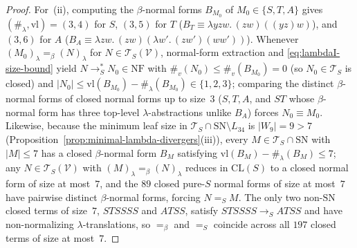 \documentclass[11pt,reqno]{amsart}
\numberwithin{equation}{section}
\theoremstyle{plain}
\theoremstyle{definition}
\theoremstyle{remark}
\newcommand{\CLS}{\mathrm{CL}(S)}
\newcommand{\TS}{\mathcal{T}_S}
\newcommand{\TSV}{\mathcal{T}_S(\mathcal{V})}
\newcommand{\NF}{\mathrm{NF}}
\newcommand{\SN}{\mathrm{SN}}
\newcommand{\redS}{\to_S}
\newcommand{\redSs}{\to_S^*}
\newcommand{\convS}{=_S}
\begin{document}
\begin{proof}
For~(ii), computing the $\beta$-normal forms $B_{M_0}$ of $M_0 \in \{S, T, A\}$ gives $(\#_\lambda, \mathrm{vl}) = (3, 4)$ for $S$, $(3, 5)$ for $T$ ($B_T \equiv \lambda y z w.\, (z w)((y z) w)$), and $(3, 6)$ for $A$ ($B_A \equiv \lambda z w.\, (z w)(\lambda w'.\, (z w')(w w'))$). Whenever $(M_0)_\lambda =_\beta (N)_\lambda$ for $N \in \TSV$, normal-form extraction and \eqref{eq:lambdaI-size-bound} yield $N \redSs N_0 \in \NF$ with $\#_v(N_0) \le \#_v(B_{M_0}) = 0$ (so $N_0 \in \TS$ is closed) and $|N_0| \le \mathrm{vl}(B_{M_0}) - \#_\lambda(B_{M_0}) \in \{1, 2, 3\}$; comparing the distinct $\beta$-normal forms of closed normal forms up to size~$3$ ($S, T, A$, and $S T$ whose $\beta$-normal form has three top-level $\lambda$-abstractions unlike $B_A$) forces $N_0 \equiv M_0$. Likewise, because the minimum leaf size in $\TS \cap \SN \setminus L_{34}$ is $|W_9| = 9 > 7$ (Proposition~\ref{prop:minimal-lambda-divergers}(iii)), every $M \in \TS \cap \SN$ with $|M| \le 7$ has a closed $\beta$-normal form $B_M$ satisfying $\mathrm{vl}(B_M) - \#_\lambda(B_M) \le 7$; any $N \in \TSV$ with $(M)_\lambda =_\beta (N)_\lambda$ reduces in $\CLS$ to a closed normal form of size at most~$7$, and the $89$ closed pure-$S$ normal forms of size at most~$7$ have pairwise distinct $\beta$-normal forms, forcing $N \convS M$. The only two non-$\SN$ closed terms of size~$7$, $S T S S S S$ and $A T S S$, satisfy $S T S S S S \redS A T S S$ and have non-normalizing $\lambda$-translations, so $=_\beta$ and $\convS$ coincide across all $197$ closed terms of size at most~$7$.


\end{proof}
\end{document}

